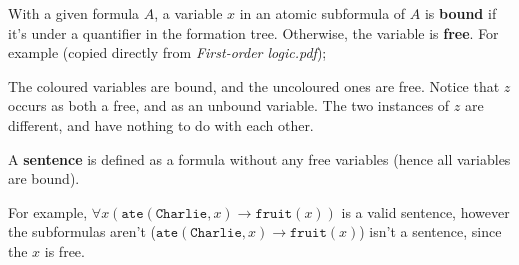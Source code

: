 \documentclass[a4paper, 12pt]{article}
\begin{document}
                With a given formula $A$, a variable $x$ in an atomic subformula of $A$ is \textbf{bound} if it's under a quantifier in the formation tree. Otherwise, the variable is \textbf{free}. For example (copied directly from \textit{First-order logic.pdf});
                \begin{center}
                \end{center}
                The coloured variables are bound, and the uncoloured ones are free. Notice that $z$ occurs as both a free, and as an unbound variable. The two instances of $z$ are different, and have nothing to do with each other.
                \medskip

                A \textbf{sentence} is defined as a formula without any free variables (hence all variables are bound).
                \medskip

                For example, $\forall x (\texttt{ate}(\texttt{Charlie}, x) \rightarrow \texttt{fruit}(x))$ is a valid sentence, however the subformulas aren't ($\texttt{ate}(\texttt{Charlie}, x) \rightarrow \texttt{fruit}(x)$) isn't a sentence, since the $x$ is free.
                \medskip
\end{document}
